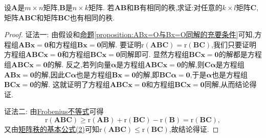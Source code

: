 \documentclass[../../main.tex]{subfiles}%
\begin{document}
\begin{proposition}\label{proposition:r(AB)=r(B)可推出r(ABC)=r(BC)}
设\(\boldsymbol{A}\)是\(m\times n\)矩阵,\(\boldsymbol{B}\)是\(n\times k\)矩阵. 若\(\boldsymbol{A}\boldsymbol{B}\)和\(\boldsymbol{B}\)有相同的秩,求证:对任意的\(k\times l\)矩阵\(\boldsymbol{C}\),矩阵\(\boldsymbol{A}\boldsymbol{B}\boldsymbol{C}\)和矩阵\(\boldsymbol{B}\boldsymbol{C}\)也有相同的秩.
\end{proposition}
\begin{proof}

{\color{blue}证法一:}
由假设和\hyperref[proposition:ABx=O与Bx=O同解的充要条件]{命题\ref{proposition:ABx=O与Bx=O同解的充要条件}}可知,方程组\(\boldsymbol{A}\boldsymbol{B}\boldsymbol{x}=\boldsymbol{0}\)和方程组\(\boldsymbol{B}\boldsymbol{x}=\boldsymbol{0}\)同解. 要证明\(\mathrm{r}(\boldsymbol{A}\boldsymbol{B}\boldsymbol{C})=\mathrm{r}(\boldsymbol{B}\boldsymbol{C})\),我们只要证明方程组\(\boldsymbol{A}\boldsymbol{B}\boldsymbol{C}\boldsymbol{x}=\boldsymbol{0}\)和方程组\(\boldsymbol{B}\boldsymbol{C}\boldsymbol{x}=\boldsymbol{0}\)同解即可. 显然方程组\(\boldsymbol{B}\boldsymbol{C}\boldsymbol{x}=\boldsymbol{0}\)的解都是方程组\(\boldsymbol{A}\boldsymbol{B}\boldsymbol{C}\boldsymbol{x}=\boldsymbol{0}\)的解. 反之,若列向量\(\boldsymbol{\alpha}\)是方程组\(\boldsymbol{A}\boldsymbol{B}\boldsymbol{C}\boldsymbol{x}=\boldsymbol{0}\)的解,则\(\boldsymbol{C}\boldsymbol{\alpha}\)是方程组\(\boldsymbol{A}\boldsymbol{B}\boldsymbol{x}=\boldsymbol{0}\)的解,因此\(\boldsymbol{C}\boldsymbol{\alpha}\)也是方程组\(\boldsymbol{B}\boldsymbol{x}=\boldsymbol{0}\)的解,即\(\boldsymbol{B}\boldsymbol{C}\boldsymbol{\alpha}=\boldsymbol{0}\),于是\(\boldsymbol{\alpha}\)也是方程组\(\boldsymbol{B}\boldsymbol{C}\boldsymbol{x}=\boldsymbol{0}\)的解. 这就证明了方程组\(\boldsymbol{A}\boldsymbol{B}\boldsymbol{C}\boldsymbol{x}=\boldsymbol{0}\)和方程组\(\boldsymbol{B}\boldsymbol{C}\boldsymbol{x}=\boldsymbol{0}\)同解,从而结论得证.

{\color{blue}证法二:}
由\hyperref[proposition:Frobenius(弗罗贝尼乌斯)不等式]{Frobenius不等式}可得
\[
\mathrm{r}(\boldsymbol{A}\boldsymbol{B}\boldsymbol{C})\geqslant \mathrm{r}(\boldsymbol{A}\boldsymbol{B})+\mathrm{r}(\boldsymbol{B}\boldsymbol{C})-\mathrm{r}(\boldsymbol{B})=\mathrm{r}(\boldsymbol{B}\boldsymbol{C}),
\]
又由\hyperref[矩阵秩的基本公式2]{矩阵秩的基本公式(2)}可知\(\mathrm{r}(\boldsymbol{A}\boldsymbol{B}\boldsymbol{C})\leqslant \mathrm{r}(\boldsymbol{B}\boldsymbol{C})\),故结论得证.

\end{proof}
\end{document}
